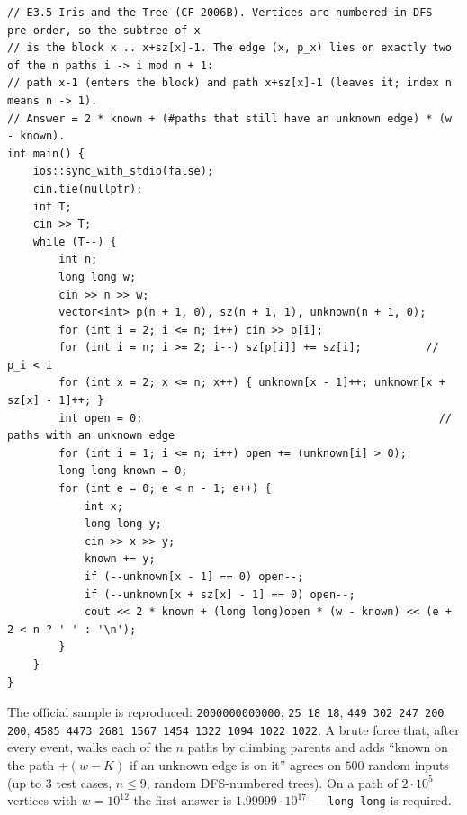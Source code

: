 \begin{solutionbox}
\begin{lstlisting}[style=cpp]
// E3.5 Iris and the Tree (CF 2006B). Vertices are numbered in DFS pre-order, so the subtree of x
// is the block x .. x+sz[x]-1. The edge (x, p_x) lies on exactly two of the n paths i -> i mod n + 1:
// path x-1 (enters the block) and path x+sz[x]-1 (leaves it; index n means n -> 1).
// Answer = 2 * known + (#paths that still have an unknown edge) * (w - known).
int main() {
    ios::sync_with_stdio(false);
    cin.tie(nullptr);
    int T;
    cin >> T;
    while (T--) {
        int n;
        long long w;
        cin >> n >> w;
        vector<int> p(n + 1, 0), sz(n + 1, 1), unknown(n + 1, 0);
        for (int i = 2; i <= n; i++) cin >> p[i];
        for (int i = n; i >= 2; i--) sz[p[i]] += sz[i];          // p_i < i
        for (int x = 2; x <= n; x++) { unknown[x - 1]++; unknown[x + sz[x] - 1]++; }
        int open = 0;                                              // paths with an unknown edge
        for (int i = 1; i <= n; i++) open += (unknown[i] > 0);
        long long known = 0;
        for (int e = 0; e < n - 1; e++) {
            int x;
            long long y;
            cin >> x >> y;
            known += y;
            if (--unknown[x - 1] == 0) open--;
            if (--unknown[x + sz[x] - 1] == 0) open--;
            cout << 2 * known + (long long)open * (w - known) << (e + 2 < n ? ' ' : '\n');
        }
    }
}
\end{lstlisting}
The official sample is reproduced: \texttt{2000000000000}, \texttt{25 18 18}, \texttt{449 302 247 200 200}, \texttt{4585 4473 2681 1567 1454 1322 1094 1022 1022}. A brute force that, after every event, walks each of the $n$ paths by climbing parents and adds ``known on the path $+ (w - K)$ if an unknown edge is on it'' agrees on $500$ random inputs (up to 3 test cases, $n \le 9$, random DFS-numbered trees). On a path of $2\cdot10^5$ vertices with $w = 10^{12}$ the first answer is $1.99999\cdot10^{17}$ --- \texttt{long long} is required.
\end{solutionbox}
